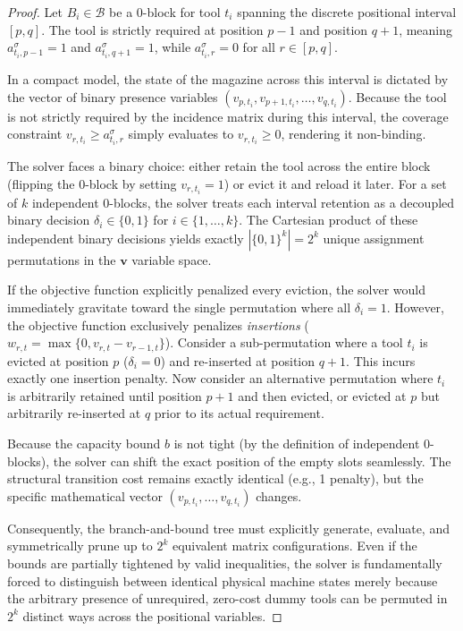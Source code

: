 \documentclass[11pt, a4paper]{book}
\begin{document}
	\begin{proof}
		Let $B_i \in \mathcal{B}$ be a 0-block for tool $t_i$ spanning the discrete positional interval $[p, q]$. The tool is strictly required at position $p-1$ and position $q+1$, meaning $a_{t_i, p-1}^\sigma = 1$ and $a_{t_i, q+1}^\sigma = 1$, while $a_{t_i, r}^\sigma = 0$ for all $r \in [p, q]$. 
		
		In a compact model, the state of the magazine across this interval is dictated by the vector of binary presence variables $(v_{p,t_i}, v_{p+1,t_i}, \dots, v_{q,t_i})$. Because the tool is not strictly required by the incidence matrix during this interval, the coverage constraint $v_{r,t_i} \ge a_{t_i, r}^\sigma$ simply evaluates to $v_{r,t_i} \ge 0$, rendering it non-binding.
		
		The solver faces a binary choice: either retain the tool across the entire block (flipping the 0-block by setting $v_{r,t_i} = 1$) or evict it and reload it later. For a set of $k$ independent 0-blocks, the solver treats each interval retention as a decoupled binary decision $\delta_i \in \{0, 1\}$ for $i \in \{1, \dots, k\}$. The Cartesian product of these independent binary decisions yields exactly $|\{0,1\}^k| = 2^k$ unique assignment permutations in the $\mathbf{v}$ variable space.
		
		If the objective function explicitly penalized every eviction, the solver would immediately gravitate toward the single permutation where all $\delta_i = 1$. However, the objective function exclusively penalizes \textit{insertions} ($w_{r,t} = \max\{0, v_{r,t} - v_{r-1,t}\}$). Consider a sub-permutation where a tool $t_i$ is evicted at position $p$ ($\delta_i = 0$) and re-inserted at position $q+1$. This incurs exactly one insertion penalty. Now consider an alternative permutation where $t_i$ is arbitrarily retained until position $p+1$ and then evicted, or evicted at $p$ but arbitrarily re-inserted at $q$ prior to its actual requirement.
		
		Because the capacity bound $b$ is not tight (by the definition of independent 0-blocks), the solver can shift the exact position of the empty slots seamlessly. The structural transition cost remains exactly identical (e.g., 1 penalty), but the specific mathematical vector $(v_{p,t_i}, \dots, v_{q,t_i})$ changes. 
		
		Consequently, the branch-and-bound tree must explicitly generate, evaluate, and symmetrically prune up to $2^k$ equivalent matrix configurations. Even if the bounds are partially tightened by valid inequalities, the solver is fundamentally forced to distinguish between identical physical machine states merely because the arbitrary presence of unrequired, zero-cost dummy tools can be permuted in $2^k$ distinct ways across the positional variables. 
	\end{proof}
	
\end{document}
